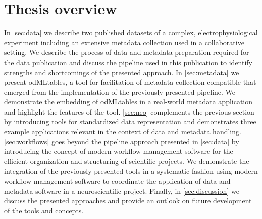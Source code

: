 \section{Thesis overview}
In \cref{sec:data} we describe two published datasets of a complex, electrophysiological experiment including an extensive metadata collection used in a collaborative setting. We describe the process of data and metadata preparation required for the data publication and discuss the pipeline used in this publication to identify strengths and shortcomings of the presented approach. In \cref{sec:metadata} we present odMLtables, a tool for facilitation of metadata collection compatible that emerged from the implementation of the previously presented pipeline. We demonstrate the embedding of odMLtables in a real-world metadata application and highlight the  features of the tool. \cref{sec:neo} complements the previous section by introducing tools for standardized data representation and demonstrates three example applications relevant in the context of data and metadata handling. \cref{sec:workflows} goes beyond the pipeline approach presented in \cref{sec:data} by introducing the concept of modern workflow management software for the efficient organization and structuring of scientific projects. We demonstrate the integration of the previously presented tools in a systematic fashion using modern workflow management software to coordinate the application of data and metadata software in a neuroscientific project. Finally, in \cref{sec:discussion} we discuss the presented approaches and provide an outlook on future development of the tools and concepts.












































